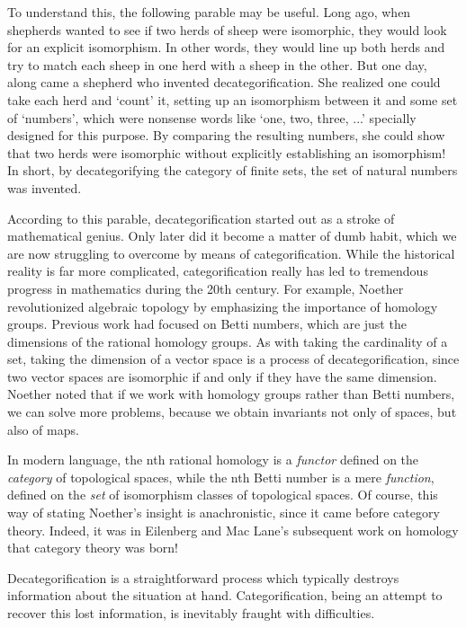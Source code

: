  To understand this, the following parable may be useful.  Long ago, when
 shepherds wanted to see if two herds of sheep were isomorphic, they
 would look for an explicit isomorphism.  In other words, they would line
 up both herds and try to match each sheep in one herd with a sheep in
 the other.  But one day, along came a shepherd who invented
 decategorification.  She realized one could take each herd and `count'
 it, setting up an isomorphism between it and some set of `numbers',
 which were nonsense words like `one, two, three, ...' specially
 designed for this purpose.  By comparing the resulting numbers, she
 could show that two herds were isomorphic without explicitly
 establishing an isomorphism!  In short, by decategorifying the category
 of finite sets, the set of natural numbers was invented.   

 According to this parable, decategorification started out as a stroke
 of mathematical genius.  Only later did it become a matter of dumb
 habit, which we are now struggling to overcome by means of
 categorification.  While the historical reality is far more
 complicated, categorification really has led to tremendous progress 
 in mathematics during the 20th century.  For example, Noether
 revolutionized algebraic topology by emphasizing the importance of
 homology groups.  Previous work had focused on Betti numbers, which
 are just the dimensions of the rational homology groups.  As with
 taking the cardinality of a set, taking the dimension of a vector
 space is a process of decategorification, since two vector spaces are
 isomorphic if and only if they have the same dimension.  Noether noted
 that if we work with homology groups rather than Betti numbers, we can
 solve more problems, because we obtain invariants not only of spaces,
 but also of maps.  

 In modern language, the nth rational homology is a \emph{functor} defined
 on the \emph{category} of topological spaces, while the nth Betti number is
 a mere \emph{function}, defined on the \emph{set} of isomorphism classes of
 topological spaces.  Of course, this way of stating Noether's insight
 is anachronistic, since it came before category theory.  Indeed, it
 was in Eilenberg and Mac Lane's subsequent work on homology that
 category theory was born!
 
 Decategorification is a straightforward process which typically
 destroys information about the situation at hand.  Categorification,
 being an attempt to recover this lost information, is inevitably
 fraught with difficulties.

